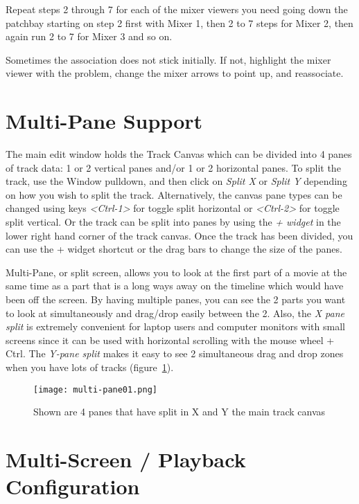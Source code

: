 Repeat steps 2 through 7 for each of the mixer viewers you need going down the patchbay starting on step 2 first with Mixer 1, then 2 to 7 steps for Mixer 2, then again run 2 to 7 for Mixer 3 and so on.

Sometimes the association does not stick initially.  If not, highlight the mixer viewer with the problem, change the mixer arrows to point up, and reassociate.

\section{Multi-Pane Support}%
\label{sec:multipane_support}

The main \CGG{} edit window holds the Track Canvas which can be divided into 4 panes of track data: 1 or 2 vertical panes and/or 1 or 2 horizontal panes.  To split the track, use the Window pulldown, and then click on \textit{Split X} or \textit{Split Y} depending on how you wish to split the track.  Alternatively, the canvas pane types can be changed using keys \textit{<Ctrl-1>} for toggle split horizontal or \textit{<Ctrl-2>} for toggle split vertical.  Or the track can be split into panes by using the \textit{+ widget} in the lower right hand corner of the track canvas.  Once the track has been divided, you can use the + widget shortcut or the drag bars to change the size of the panes.

Multi-Pane, or split screen, allows you to look at the first part of a movie at the same time as a part that is a long ways away on the timeline which would have been off the screen.  By having multiple panes, you can see the 2 parts you want to look at simultaneously and drag/drop easily between the 2.  Also, the \textit{X pane split} is extremely convenient for laptop users and computer monitors with small screens since it can be used with horizontal scrolling with the mouse wheel + Ctrl.  The \textit{Y-pane split} makes it easy to see 2 simultaneous drag and drop zones when you have lots of tracks (figure~\ref{fig:multi-pane01}).

\begin{figure}[htpb]
    \centering
    \texttt{[image: multi-pane01.png]}
    \caption{Shown are 4 panes that have split in X and Y the main track canvas}
    \label{fig:multi-pane01}
\end{figure}

\section{Multi-Screen / Playback Configuration}%
\label{sec:multiscreen_playback_configuration}

